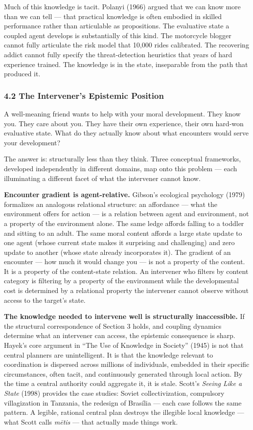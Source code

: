 \documentclass[
]{article}
\begin{document}
Much of this knowledge is tacit. Polanyi (1966) argued that we can know
more than we can tell --- that practical knowledge is often embodied in
skilled performance rather than articulable as propositions. The
evaluative state a coupled agent develops is substantially of this kind.
The motorcycle blogger cannot fully articulate the risk model that
10,000 rides calibrated. The recovering addict cannot fully specify the
threat-detection heuristics that years of hard experience trained. The
knowledge is in the state, inseparable from the path that produced it.

\subsubsection{4.2 The Intervener's Epistemic
Position}\label{the-interveners-epistemic-position}

A well-meaning friend wants to help with your moral development. They
know you. They care about you. They have their own experience, their own
hard-won evaluative state. What do they actually know about what
encounters would serve your development?

The answer is: structurally less than they think. Three conceptual
frameworks, developed independently in different domains, map onto this
problem --- each illuminating a different facet of what the intervener
cannot know.

\textbf{Encounter gradient is agent-relative.} Gibson's ecological
psychology (1979) formalizes an analogous relational structure: an
affordance --- what the environment offers for action --- is a relation
between agent and environment, not a property of the environment alone.
The same ledge affords falling to a toddler and sitting to an adult. The
same moral content affords a large state update to one agent (whose
current state makes it surprising and challenging) and zero update to
another (whose state already incorporates it). The gradient of an
encounter --- how much it would change you --- is not a property of the
content. It is a property of the content-state relation. An intervener
who filters by content category is filtering by a property of the
environment while the developmental cost is determined by a relational
property the intervener cannot observe without access to the target's
state.

\textbf{The knowledge needed to intervene well is structurally
inaccessible.} If the structural correspondence of Section 3 holds, and
coupling dynamics determine what an intervener can access, the epistemic
consequence is sharp. Hayek's core argument in ``The Use of Knowledge in
Society'' (1945) is not that central planners are unintelligent. It is
that the knowledge relevant to coordination is dispersed across millions
of individuals, embedded in their specific circumstances, often tacit,
and continuously generated through local action. By the time a central
authority could aggregate it, it is stale. Scott's \emph{Seeing Like a
State} (1998) provides the case studies: Soviet collectivization,
compulsory villagization in Tanzania, the redesign of Brasília --- each
case follows the same pattern. A legible, rational central plan destroys
the illegible local knowledge --- what Scott calls \emph{mētis} --- that
actually made things work.
\end{document}
